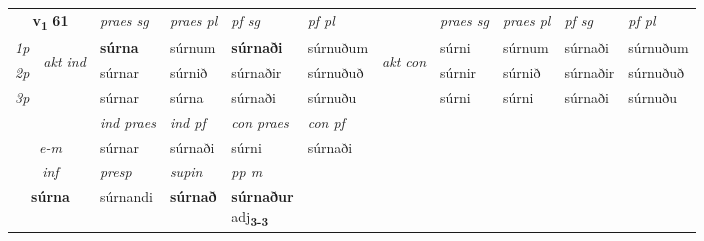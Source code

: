 \noindent
\begin{tabular}{lllllllllll} \toprule
\multicolumn{2}{c}{\textbf{v{\textsubscript{1}}} \Large{\textbf{61}}}  &  \textit{praes sg}  & \textit{praes pl}  &\textit{ pf sg} & \textit{pf pl} &  &  \textit{praes sg}  & \textit{praes pl}  & \textit{pf sg} & \textit{pf pl } \\*
	\cmidrule{3-6} \cmidrule{8-11}
 {\textit{1p}} & \multirow{3}{*}{\begin{turn}{90}\textit{akt ind}\end{turn}} & \textbf{súrna} & súrnum & \textbf{súrnaði} & súrnuðum & \multirow{3}{*}{\begin{turn}{90}\textit{akt con}\end{turn}} &súrni & súrnum & súrnaði & súrnuðum\\*
 {\textit{2p}} &  &  súrnar  & súrnið & súrnaðir & súrnuðuð & & súrnir & súrnið & súrnaðir & súrnuðuð \\*
{\textit{3p}} &  & súrnar & súrna & súrnaði & súrnuðu & & súrni & súrni& súrnaði & súrnuðu \\*
\cmidrule{3-6} \cmidrule{8-11}

   & &  \textit{ind praes} & \textit{ind pf} & \textit{con praes} & \textit{con pf} \\*
\multicolumn{2}{c}{ \textit{e-m} } & súrnar & súrnaði & súrni & súrnaði \\*

\cmidrule{3-5}
   \multicolumn{2}{c}{\textit{inf}}     & \textit{presp} & \textit{supin}  & \textit{pp m} \\*
  \multicolumn{2}{c}{\textbf{súrna}}      & súrnandi &  \textbf{súrnað}  & \specialcell{\textbf{súrnaður} \\ adj\textbf{\textsubscript{3-3}}} \\*
\end{tabular}


